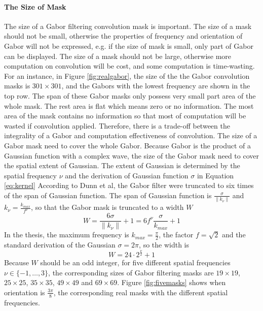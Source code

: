 \paragraph{The Size of Mask}
The size of a Gabor filtering convolution mask is important. The size of a mask should not be small, otherwise the properties of frequency and orientation of Gabor will not be expressed, e.g. if the size of mask is small, only part of Gabor can be displayed. The size of a mask should not be large, otherwise more computation on convolution will be cost, and some computation is time-wasting. For an instance, in \mbox{Figure} \ref{fig:realgabor}, the size of the the Gabor convolution masks is $301\times301$, and the Gabors with the lowest frequency are shown in the top row. The span of these Gabor masks only possess very small part area of the whole mask. The rest area is flat which means zero or no information. The most area of the mask contains no information so that most of computation will be wasted if convolution applied.  Therefore, there is a trade-off between the integrality of a Gabor and computation effectiveness of convolution. The size of a Gabor mask need to cover the whole Gabor. Because Gabor is the product of a Gaussian function with a complex wave, the size of the Gabor mask need to cover the spatial extent of Gaussian. The extent of Gaussian is determined by the spatial frequency $\nu$ and the derivation of Gaussian function $\sigma$ in \mbox{Equation} \ref{eq:kernel}  According to Dunn et al\cite{Dunn1995}, the Gabor filter were truncated to six times of the span of Gaussian function. The span of Gaussian function is $\frac{\sigma}{\|k_{\nu}\|}$ and $k_{\nu}=\frac{k_{max}}{f^{\nu}}$, so that the Gabor mask is truncated to a width $W$
 \begin{equation}
  W  = \frac{6\sigma}{\|k_{\nu}\|}+1 = 6 f^{\nu}\frac{\sigma}{k_{max}}+1
 \end{equation}
In the thesis, the maximum frequency is $k_{max}=\frac{\pi}{2}$, the factor $f = \sqrt{2}$ and the standard derivation of the Gaussian $\sigma=2\pi$, so the width is 
\begin{equation}
 W = 24\cdot2^{\frac{\nu}{2}}+1
\end{equation}
Because $W$ should be an odd integer, for five different spatial frequencies $\nu\in\{-1,\ldots,3\}$, the corresponding sizes of Gabor filtering masks are $19\times19$, $25\times25$, $35\times35$, $49\times49$ and $69\times69$. \mbox{Figure} \ref{fig:fivemasks} shows when orientation is $\frac{3\pi}{8}$, the corresponding real masks with the different spatial frequencies.
